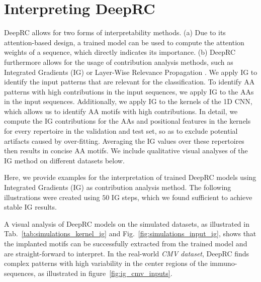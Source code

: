 \documentclass[oneside]{book}
\begin{document}
%

%

%


\clearpage
\section{Interpreting DeepRC}
\label{appsec:integrated_gradients}
DeepRC allows for two forms of interpretability methods.
(a) Due to its attention-based design,
a trained model can be used to compute the attention weights of a sequence, which directly indicates its importance.
(b) DeepRC furthermore allows for the usage of contribution analysis 
methods, such as Integrated Gradients (IG) 
\citep{sundararajan2017axiomatic} or Layer-Wise Relevance 
Propagation \citep{montavon2018methods,arras2019explaining,montavon2019layer,preuer2019interpretable}.
We apply IG to identify the input patterns that are 
relevant for the classification.
To identify AA patterns with high contributions in the input sequences,
we apply IG to the AAs in the input sequences.
Additionally, we apply IG to the kernels of the 1D CNN,
which allows us to identify AA motifs with high contributions.
In detail, 
we compute the IG contributions for 
the AAs and positional features in the kernels for every repertoire in the validation and test set,
so as to exclude potential artifacts caused by  over-fitting.
Averaging the IG values over these repertoires then results in concise AA motifs.
%
We include qualitative visual analyses of the IG method 
on different datasets below.
%

Here, we provide examples for the interpretation of trained DeepRC models
using Integrated Gradients (IG) \citep{sundararajan2017axiomatic} as contribution analysis method.
The following illustrations were created using $50$ IG steps,
which we found sufficient to achieve stable IG results.

A visual analysis of DeepRC models on the simulated datasets,
as illustrated in Tab.~\ref{tab:simulations_kernel_ig} and Fig.~\ref{fig:simulations_input_ig},
shows that the implanted motifs can be successfully extracted from the trained model
and are straight-forward to interpret.
In the real-world \emph{CMV dataset},
DeepRC finds complex patterns with high variability in the center regions of the immuno-sequences,
as illustrated in figure~\ref{fig:ig_cmv_inputs}.
\end{document}
